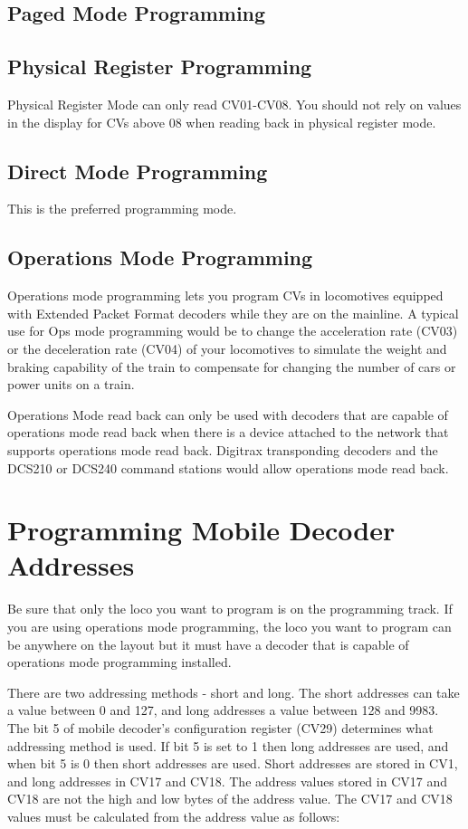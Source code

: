 \subsection{Paged Mode Programming}

\subsection{Physical Register Programming}
Physical Register Mode can only read CV01-CV08. You should not rely on values in the display for CVs above 08 when reading back in physical register mode.

\subsection{Direct Mode Programming}
This is the preferred programming mode.

\subsection{Operations Mode Programming}
Operations mode programming lets you program CVs in locomotives equipped with Extended Packet Format decoders while they are on the mainline. A typical use for Ops mode programming would be to change the acceleration rate (CV03) or the deceleration rate (CV04) of your locomotives to simulate the weight and braking capability of the train to compensate for changing the number of cars or power units on a train.

Operations Mode read back can only be used with decoders that are capable of operations mode read back when there is a device attached to the network that supports operations mode read back. Digitrax transponding decoders and the DCS210 or DCS240 command stations would allow operations mode read back.

\section{Programming Mobile Decoder Addresses}

Be sure that only the loco you want to program is on the programming track. If you are using operations mode programming, the loco you want to program can be anywhere on the layout but it must have a decoder that is capable of operations mode programming installed.

There are two addressing methods - short and long. The short addresses can take a value between 0 and 127, and long addresses a value between 128 and 9983. The bit 5 of mobile decoder's configuration register (CV29) determines what addressing method is used. If bit 5 is set to 1 then long addresses are used, and when bit 5 is 0 then short addresses are used. Short addresses are stored in CV1, and long addresses in CV17 and CV18. The address values stored in CV17 and CV18 are not the high and low bytes of the address value. The CV17 and CV18 values must be calculated from the address value as follows:

